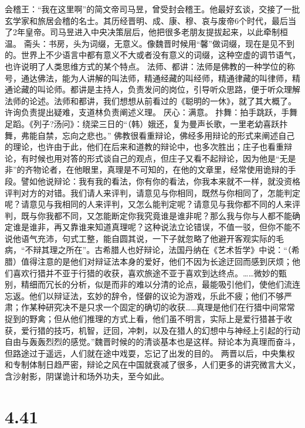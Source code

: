 \documentclass[]{book}
\begin{document}
会稽王：``我在这里啊''的简文帝司马昱，曾受封会稽王。他最好玄谈，交接了一批玄学家和旅居会稽的名士。其历经晋明、成、康、穆、哀与废帝6个时代，最后当了2年皇帝。司马昱进入中央决策层后，他把很多老朋友提拔起来，以此牵制桓温。
斋头：书房，头为词缀，无意义。像魏晋时候用``馨''做词缀，现在是见不到的。世界上不少语言中都有意义不大或者没有意义的词缀，这种空虚的调节语气，也许说明了人类思维方式的某个特点。
法师、都讲：法师是佛教的一种学位的称号，通达佛法，能为人讲解的叫法师，精通经藏的叫经师，精通律藏的叫律师，精通论藏的叫论师。都讲是主持人，负责发问的岗位，引导听众思路，便于听众理解法师的论述。法师和都讲，我们想想从前看过的《聪明的一休》，就了其大概了。许询负责提出疑难，支道林负责阐述义理。
厌心：满意。
抃舞：拍手跳跃，手舞足蹈。《列子?汤问》：绕梁三日的``（韩）娥还，复为曼声长歌，一里老幼喜跃抃舞，弗能自禁，忘向之悲也。''
佛教很看重辩论，佛经多用辩论的形式来阐述自己的理论，也许由于此，他们在后来和道教的辩论中，也多次胜出；庄子也看重辩论，有时候也用对答的形式谈自己的观点，但庄子又看不起辩论，因为他是``无是非''的齐物论者，在他眼里，真理是不可知的，在他的文章里，经常使用诡辩的手段。譬如他说辩论：我有我的看法，你有你的看法，你我本来就不一样，就没资格评判对方的对错。我们请人来评判，请意见与你相同，既然与你相同了，怎能判定呢？请意见与我相同的人来评判，又怎么能判定呢？请意见与我你都不同的人来评判，既与你我都不同，又怎能断定你我究竟谁是谁非呢？那么我与你与人都不能确定谁是谁非，再又靠谁来知道真理呢？这种说法立论错误，不值一驳，但你不能不说他语气充沛，句式工整，能自圆其说，一下子就忽略了他避开客观实际的毛病，``不辩其理之所在''。古希腊人也好辩论，法国丹纳在《艺术哲学》中说：``（希腊）值得注意的是他们对辩证法本身的爱好，他们不因为长途迂回而感到厌烦；他们喜欢行猎并不亚于行猎的收获，喜欢旅途不亚于喜欢到达终点。\ldots{}\ldots{}微妙的甄别，精细而冗长的分析，似是而非的难以分清的论点，最能吸引他们，使他们流连忘返。他们以辩证法，玄妙的辞令，怪僻的议论为游戏，乐此不疲；他们不够严肃；作某种研究决不是只求一个固定的确切的收获\ldots{}\ldots{}真理是他们在行猎中间常常捉到的野禽；但从他们推理的方式上看，他们虽不明言，实际上是爱行猎甚于收获，爱行猎的技巧，机智，迂回，冲刺，以及在猎人的幻想中与神经上引起的行动自由与轰轰烈烈的感觉。''魏晋时候的的清谈基本也是这样。辩论本为真理而奋斗，但路途过于遥远，人们就在途中戏耍，忘记了出发的目的。
两晋以后，中央集权和专制体制日趋严密，辩论之风在中国就衰减了很多，人们更多的讲究微言大义，含沙射影，阴谋诡计和场外功夫，至今如此。

\section{4.41}\label{section-219}
\end{document}
